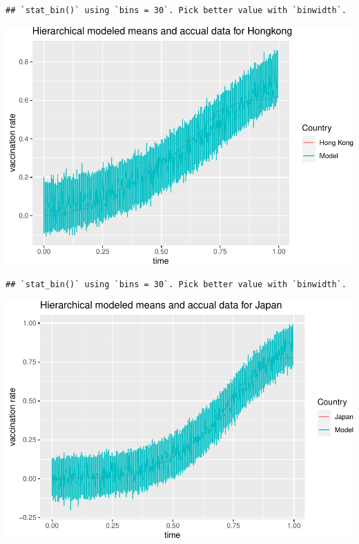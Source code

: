 \documentclass[
]{article}
\newenvironment{Shaded}{\begin{snugshade}}{\end{snugshade}}
\newcommand{\AttributeTok}[1]{\textcolor[rgb]{0.77,0.63,0.00}{#1}}
\newcommand{\DecValTok}[1]{\textcolor[rgb]{0.00,0.00,0.81}{#1}}
\newcommand{\FunctionTok}[1]{\textcolor[rgb]{0.00,0.00,0.00}{#1}}
\newcommand{\NormalTok}[1]{#1}
\newcommand{\SpecialCharTok}[1]{\textcolor[rgb]{0.00,0.00,0.00}{#1}}
\newcommand{\StringTok}[1]{\textcolor[rgb]{0.31,0.60,0.02}{#1}}
\begin{document}
\begin{verbatim}
## `stat_bin()` using `bins = 30`. Pick better value with `binwidth`.
\end{verbatim}

\includegraphics{bda_project_files/figure-latex/unnamed-chunk-33-1.pdf}

\begin{Shaded}
\end{Shaded}

\begin{verbatim}
## `stat_bin()` using `bins = 30`. Pick better value with `binwidth`.
\end{verbatim}

\includegraphics{bda_project_files/figure-latex/unnamed-chunk-34-1.pdf}
\end{document}
